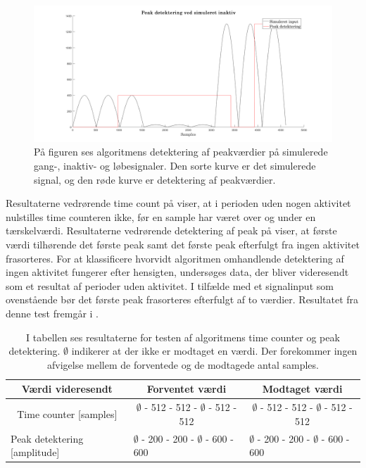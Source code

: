 \begin{figure}[H]
	\centering
	\includegraphics[width=.9\textwidth]{figures/cDesign/test_peak_inaktiv.png}
	\caption{På figuren ses algoritmens detektering af peakværdier på simulerede gang-, inaktiv- og løbesignaler. Den sorte kurve er det simulerede signal, og den røde kurve er detektering af peakværdier.}
	\label{fig:test_inaktiv_peak}
\end{figure}\vspace{-0.25cm}
Resultaterne vedrørende time count på  viser, at i perioden uden nogen aktivitet nulstilles time counteren ikke, før en sample har været over og under en tærskelværdi. Resultaterne vedrørende detektering af peak på  viser, at første værdi tilhørende det første peak samt det første peak efterfulgt fra ingen aktivitet frasorteres. For at klassificere hvorvidt algoritmen omhandlende detektering af ingen aktivitet fungerer efter hensigten, undersøges data, der bliver videresendt som et resultat af perioder uden aktivitet. I tilfælde med et signalinput som ovenstående bør det første peak frasorteres efterfulgt af to værdier. Resultatet fra denne test fremgår i .
\begin{table}[H]
	\centering
	\begin{tabular}{ccc}
		\hline
		\rowcolor[HTML]{C0C0C0} 
		Værdi videresendt & Forventet værdi & Modtaget værdi \\ \hline
		Time counter [samples] & $\emptyset$ - 512 - 512 - $\emptyset$ - 512 - 512 & $\emptyset$ - 512 - 512 - $\emptyset$ - 512 - 512 \\ \hline
		\multicolumn{1}{l}{Peak detektering [amplitude]} &     \multicolumn{1}{l}{$\emptyset$ - 200 - 200 - $\emptyset$ - 600 - 600}     &     \multicolumn{1}{l}{$\emptyset$ - 200 - 200 - $\emptyset$ - 600 - 600} \\ \hline
	\end{tabular}
	\caption{I tabellen ses resultaterne for testen af algoritmens time counter og peak detektering. $\emptyset$ indikerer at der ikke er modtaget en værdi. Der forekommer ingen afvigelse mellem de forventede og de modtagede antal samples.}
	\label{tab:test_inaktiv}
\end{table}\vspace{-0.25cm}
